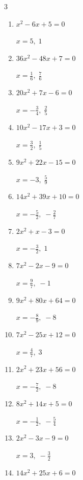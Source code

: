 \begin{multicols}{3}
\begin{enumerate}
  \item $x^{2}-6x+5=0$

        $\displaystyle x=5,\; 1$

  \item $36x^{2}-48x+7=0$

        $\displaystyle x=\frac{1}{6},\; \frac{7}{6}$

  \item $20x^{2}+7x-6=0$

        $\displaystyle x=-\frac{3}{4},\; \frac{2}{5}$

  \item $10x^{2}-17x+3=0$

        $\displaystyle x=\frac{3}{2},\; \frac{1}{5}$

  \item $9x^{2}+22x-15=0$

        $\displaystyle x=-3,\; \frac{5}{9}$

\columnbreak %

  \item $14x^{2}+39x+10=0$

        $\displaystyle x=-\frac{5}{2},\; -\frac{2}{7}$

  \item $2x^{2}+x-3=0$

        $\displaystyle x=-\frac{3}{2},\; 1$

  \item $7x^{2}-2x-9=0$

        $\displaystyle x=\frac{9}{7},\; -1$

  \item $9x^{2}+80x+64=0$

        $\displaystyle x=-\frac{8}{9},\; -8$

  \item $7x^{2}-25x+12=0$

        $\displaystyle x=\frac{4}{7},\; 3$

  \item $2x^{2}+23x+56=0$

        $\displaystyle x=-\frac{7}{2},\; -8$

  \item $8x^{2}+14x+5=0$

        $\displaystyle x=-\frac{1}{2},\; -\frac{5}{4}$

  \item $2x^{2}-3x-9=0$

        $\displaystyle x=3,\; -\frac{3}{2}$

  \item $14x^{2}+25x+6=0$


\end{enumerate}
\end{multicols}
